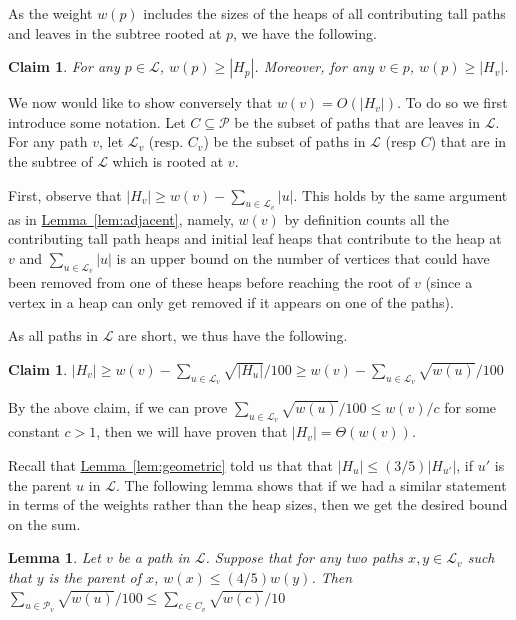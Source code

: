 \documentclass[11pt]{article}
\newtheorem{lemma}[theorem]{Lemma}
\newtheorem{claim}[theorem]{Claim}
\theoremstyle{definition}
\newcommand{\Lem}[1]{\hyperref[lem:#1]{Lemma~\ref*{lem:#1}}} %
\begin{document}
{As the weight $w(p)$ includes the sizes of the heaps of all contributing tall paths and leaves in the subtree rooted at $p$, we have the following.

\begin{claim}
For any $p\in \mathcal{L}$, $w(p)\geq |H_p|$.  Moreover, for any $v\in p$, $w(p)\geq |H_v|$.
\end{claim}


We now would like to show conversely that $w(v)= O(|H_v|)$.  
To do so we first introduce some notation.  
Let $C\subseteq \mathcal{P}$ be the subset of paths that are leaves in $\mathcal{L}$.
For any path $v$, let $\mathcal{L}_v$ (resp. $C_v$) be the subset of paths in $\mathcal{L}$ (resp $C$) 
that are in the subtree of $\mathcal{L}$ which is rooted at $v$.

First, observe that $|H_v|\geq w(v)-\sum_{u\in \mathcal{L}_v} |u|$.  
This holds by the same argument as in \Lem{adjacent}, namely, $w(v)$ by definition 
counts all the contributing tall path heaps and initial leaf heaps that contribute 
to the heap at $v$ and $\sum_{u\in \mathcal{L}_v} |u|$ is an upper bound on the number 
of vertices that could have been removed from one of these heaps before reaching the 
root of $v$ (since a vertex in a heap can only get removed if it appears on one of 
the paths).  

As all paths in $\mathcal{L}$ are short, we thus have the following.

\begin{claim}
$|H_v|\geq w(v)-\sum_{u\in \mathcal{L}_v} \sqrt{|H_u|}/100 \geq w(v)-\sum_{u\in \mathcal{L}_v} \sqrt{w(u)}/100$
\end{claim}

By the above claim, if we can prove $\sum_{u\in \mathcal{L}_v} \sqrt{w(u)}/100 \leq w(v)/c$ for some constant $c>1$, 
then we will have proven that $|H_v| = \Theta(w(v))$.  

Recall that \Lem{geometric} told us that that $|H_{u}|\leq (3/5) |H_{u'}|$, if $u'$ is the parent $u$ in $\mathcal{L}$. 
The following lemma shows that if we had a similar statement in terms of the weights rather than the heap sizes, 
then we get the desired bound on the sum.

\begin{lemma}
\label{lem:distribution}
Let $v$ be a path in $\mathcal{L}$.  Suppose that for any two paths $x,y\in \mathcal{L}_v$ 
such that $y$ is the parent of $x$, $w(x)\leq (4/5) w(y)$.
Then $\sum_{u\in \mathcal{P}_v} \sqrt{w(u)}/100 \leq \sum_{c\in C_v} \sqrt{w(c)}/10$
\end{lemma}

}
\end{document}
